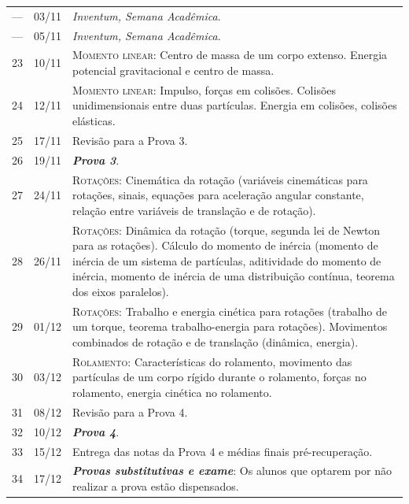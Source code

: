 \begin{center}
\begin{longtable}{ccp{70mm}}
---	 &	03/11	 &	\emph{Inventum, Semana Acadêmica}. \\
---	 &	05/11	 &	\emph{Inventum, Semana Acadêmica}. \\
23	 & 	10/11	 & 	\textsc{Momento linear:} Centro de massa de um corpo extenso. Energia potencial gravitacional e centro de massa. \\
24 	 &	12/11	 &	\textsc{Momento linear:} Impulso, forças em colisões. Colisões unidimensionais entre duas partículas. Energia em colisões, colisões elásticas. \\	
25	 & 	17/11	 & 	Revisão para a Prova 3. \\
26	 & 	19/11	 & 	\textbf{\textit{Prova 3}}. \\
27	 & 	24/11	 & 	\textsc{Rotações:} Cinemática da rotação (variáveis cinemáticas para rotações, sinais, equações para aceleração angular constante, relação entre variáveis de translação e de rotação). \\
28	 & 	26/11	 & 	\textsc{Rotações:} Dinâmica da rotação (torque, segunda lei de Newton para as rotações). Cálculo do momento de inércia (momento de inércia de um sistema de partículas, aditividade do momento de inércia, momento de inércia de uma distribuição contínua, teorema dos eixos paralelos). \\
29	 & 	01/12	 & 	\textsc{Rotações:} Trabalho e energia cinética para rotações (trabalho de um torque, teorema trabalho-energia para rotações). Movimentos combinados de rotação e de translação (dinâmica, energia). \\
30	 & 	03/12	 & 	\textsc{Rolamento:} Características do rolamento, movimento das partículas de um corpo rígido durante o rolamento, forças no rolamento, energia cinética no rolamento. \\
31	 &	08/12	 &	Revisão para a Prova 4. \\
32 	 & 	10/12	 & 	\textbf{\textit{Prova 4}}. \\
33 	 & 	15/12	 & 	Entrega das notas da Prova 4 e médias finais pré-recuperação. \\
34 	 & 	17/12	 & 	\textbf{\textit{Provas substitutivas e exame}}: Os alunos que optarem por não realizar a prova estão dispensados. \\
\end{longtable}
\end{center}


\cleardoublepage

